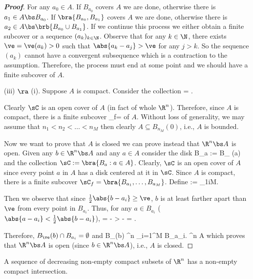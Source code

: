 \begin{proof}[\bf Proof]
For any $a_0\in A$. If $B_{a_0}$ covers $A$ we are done, otherwise there is $a_1\in A\bs B_{a_0}$. If $\bra{B_{a_0},B_{a_1}}$ covers $A$ we are done, otherwise there is $a_2\in A\bs\brb{B_{a_0}\cup B_{a_1}}$. If we continue this process we either obtain a finite subcover or a sequence $(a_k)_{k\in \N}$. Observe that for any $k\in \N$, there exists $\ve = \ve(a_k)>0$ such that $\abs{a_k - a_j}>\ve$ for any $j>k$. So the sequence $(a_k)$ cannot have a convergent subsequence which is a contraction to the assumption. Therefore, the process must end at some point and we should have a finite subcover of $A$.


\item [(iii)] $\ra$ (i). Suppose $A$ is compact. Consider the collection
\be
\sC = .
\ee

Clearly $\sC$ is an open cover of $A$ (in fact of whole $\R^n$). Therefore, since $A$ is compact, there is a finite subcover
\be
\sC_f= 
\ee
of $A$. Without loss of generality, we may assume that $n_1<n_2 < \dots < n_M$ then clearly $A \subseteq B_{n_M}(0)$, i.e., $A$ is bounded.

Now we want to prove that $A$ is closed we can prove instead that $\R^n\bs A$ is open. Given any $b\in \R^n\bs A$ and any $a\in A$ consider the disk
\be
B_a := B_{ }(a)
\ee
and the collection $\sC := \bra{B_a : a\in A}$. Clearly, $\sC$ is an open cover of $A$ since every point $a$ in $A$ has a disk centered at it in $\sC$. Since $A$ is compact, there is a finite subcover $\sC_f = \bra{B_{a_1},\dots,B_{a_M}}$. Define
\be
\ve := \min_{1\leq i\leq M}.
\ee

Then we observe that since $\frac 12 \abs{b - a_i} \geq \ve$, $b$ is at least farther apart than $\ve$ from every point in $B_{a_i}$. Thus, for any $a\in B_{a_i}$ ($\abs{a-a_i} < \frac 12 \abs{b-a_i}$),
\be
{} =  \geq {} -  >  -   =   \geq \ve.
\ee

Therefore, $B_{\ve}(b) \cap B_{a_i}= \emptyset$ and
\be
B_{\ve}(b) \subseteq \R^n \left\bs \bigcup_{i=1}^M B_{a_i}\right. \subseteq \R^n \bs A
\ee
which proves that $\R^n\bs A$ is open (since $b\in \R^n\bs A$), i.e., $A$ is closed.
\een
\end{proof}

\begin{theorem}\label{thm:intersection_of_decreasing_non_empty_compact_sets_in_real_n_non_emptyset_compact}
A sequence of decreasing non-empty compact subsets of $\R^n$ has a non-empty compact intersection.
\end{theorem}

